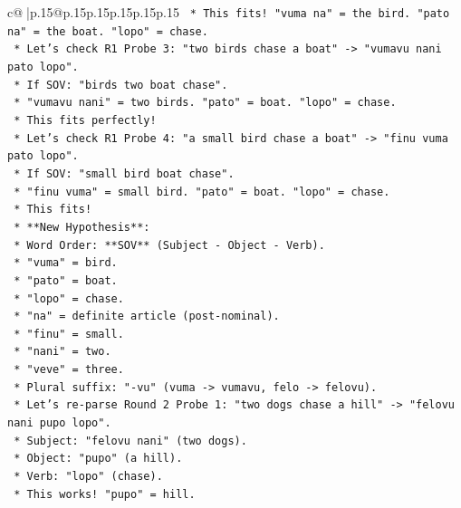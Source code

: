 \documentclass{article}
\begin{document}
{\begin{supertabular}{c@{$\;$}|p{.15\linewidth}@{}p{.15\linewidth}p{.15\linewidth}p{.15\linewidth}p{.15\linewidth}p{.15\linewidth}}
{{{\texttt{                *   This fits! "vuma na" = the bird. "pato na" = the boat. "lopo" = chase.} \\
\texttt{                *   Let's check R1 Probe 3: "two birds chase a boat" {-}> "vumavu nani pato lopo".} \\
\texttt{                *   If SOV: "birds two boat chase".} \\
\texttt{                *   "vumavu nani" = two birds. "pato" = boat. "lopo" = chase.} \\
\texttt{                *   This fits perfectly!} \\
\texttt{                *   Let's check R1 Probe 4: "a small bird chase a boat" {-}> "finu vuma pato lopo".} \\
\texttt{                *   If SOV: "small bird boat chase".} \\
\texttt{                *   "finu vuma" = small bird. "pato" = boat. "lopo" = chase.} \\
\texttt{                *   This fits!} \\
\texttt{            *   **New Hypothesis**:} \\
\texttt{                *   Word Order: **SOV** (Subject {-} Object {-} Verb).} \\
\texttt{                *   "vuma" = bird.} \\
\texttt{                *   "pato" = boat.} \\
\texttt{                *   "lopo" = chase.} \\
\texttt{                *   "na" = definite article (post{-}nominal).} \\
\texttt{                *   "finu" = small.} \\
\texttt{                *   "nani" = two.} \\
\texttt{                *   "veve" = three.} \\
\texttt{                *   Plural suffix: "{-}vu" (vuma {-}> vumavu, felo {-}> felovu).} \\
\texttt{            *   Let's re{-}parse Round 2 Probe 1: "two dogs chase a hill" {-}> "felovu nani pupo lopo".} \\
\texttt{                *   Subject: "felovu nani" (two dogs).} \\
\texttt{                *   Object: "pupo" (a hill).} \\
\texttt{                *   Verb: "lopo" (chase).} \\
\texttt{                *   This works! "pupo" = hill.} \\
}}}
\end{supertabular}}
\end{document}
